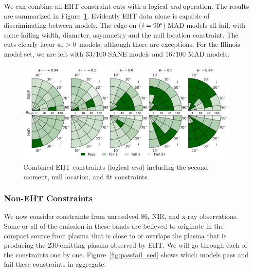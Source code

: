 
We can combine all EHT constraint cuts with a logical {\em and} operation.  The results are summarized in Figure~\ref{fig:all_EHT_constraints}.  Evidently EHT data alone is capable of discriminating between models.   The edge-on ($i = 90\degree$) MAD models all fail, with some failing \mring width, diameter, asymmetry and the null location constraint.  The cuts clearly favor $a_* > 0$ models, although there are exceptions.  For the Illinois model set, we are left with $33/100$ SANE models and $16/100$ MAD models.

\begin{figure}
  \centering
    \includegraphics[width=\textwidth]{./figures/Interferometric_Constraints.png}
  \caption{Combined EHT constraints (logical {\em and}) including the second moment, null location, and \mring fit constraints.}
  \label{fig:all_EHT_constraints}
\end{figure}

\subsubsection{Non-EHT Constraints}

We now consider constraints from unresolved 86\GHz, NIR, and x-ray
observations.
Some or all of the emission in these bands are believed to originate
in the compact source from plasma that is close to or overlaps the
plasma that is producing the 230\GHz-emitting plasma observed by EHT.
We will go through each of the constraints one by one.
Figure~\ref{fig:passfail_sed} shows which models pass and fail these
constraints in aggregate.

